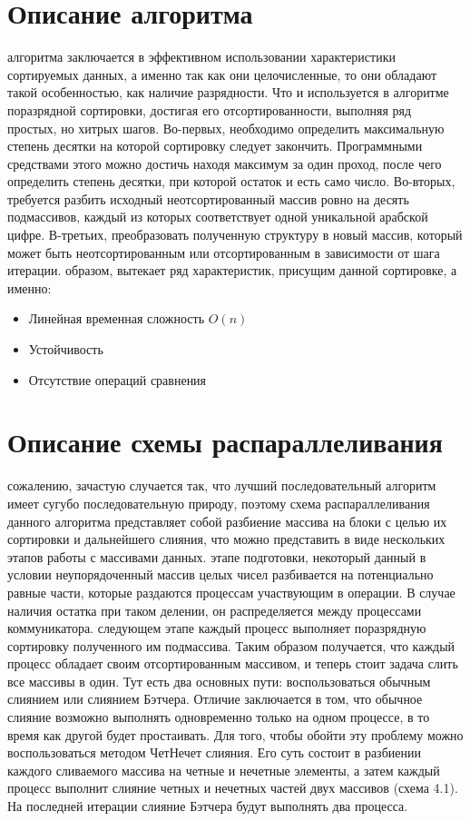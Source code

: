 \documentclass[12pt]{report}
\begin{document}
\section*{Описание алгоритма}
 алгоритма заключается в эффективном использовании характеристики сортируемых данных, а именно так как они целочисленные, то они обладают такой особенностью, как наличие разрядности. Что и используется в алгоритме поразрядной сортировки, достигая его отсортированности, выполняя ряд простых, но хитрых шагов. Во-первых, необходимо определить максимальную степень десятки на которой сортировку следует закончить. Программными средствами этого можно достичь находя максимум за один проход, после чего определить степень десятки, при которой остаток и есть само число. Во-вторых, требуется разбить исходный неотсортированный массив ровно на десять подмассивов, каждый из которых соответствует одной уникальной арабской цифре. В-третьих, преобразовать полученную структуру в новый массив, который может быть неотсортированным или отсортированным в зависимости от шага итерации.
 образом, вытекает ряд характеристик, присущим данной сортировке, а именно:
\begin{itemize}
    \item Линейная временная сложность $O(n)$
    \item Устойчивость
    \item Отсутствие операций сравнения
\end{itemize}

\newpage


\section*{Описание схемы распараллеливания}
 сожалению, зачастую случается так, что лучший последовательный алгоритм имеет сугубо последовательную природу, поэтому схема распараллеливания данного алгоритма представляет собой разбиение массива на блоки с целью их сортировки и дальнейшего слияния, что можно представить в виде нескольких этапов работы с массивами данных.
 этапе подготовки, некоторый данный в условии неупорядоченный массив целых чисел разбивается на потенциально равные части, которые раздаются процессам участвующим в операции. В случае наличия остатка при таком делении, он распределяется между процессами коммуникатора.
 следующем этапе каждый процесс выполняет поразрядную сортировку полученного им подмассива. Таким образом получается, что каждый процесс обладает своим отсортированным массивом, и теперь стоит задача слить все массивы в один. Тут есть два основных пути: воспользоваться обычным слиянием или слиянием Бэтчера. Отличие заключается в том, что обычное слияние возможно выполнять одновременно только на одном процессе, в то время как другой будет простаивать. Для того, чтобы обойти эту проблему можно воспользоваться методом ЧетНечет слияния. Его суть состоит в разбиении каждого сливаемого массива на четные и нечетные элементы, а затем каждый процесс выполнит слияние четных и нечетных частей двух массивов (схема 4.1). На последней итерации слияние Бэтчера будут выполнять два процесса.
\end{document}
